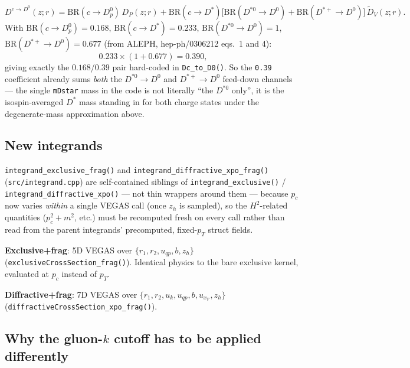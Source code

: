 \documentclass[11pt]{article}
\begin{document}
\[
D^{c\to D^0}(z;r) = \mathrm{BR}(c\to D^0_p)\,D_P(z;r)
   + \mathrm{BR}(c\to D^*)\big[\mathrm{BR}(D^{*0}\to D^0)
   + \mathrm{BR}(D^{*+}\to D^0)\big]\,\tilde D_V(z;r).
\]
With $\mathrm{BR}(c\to D^0_p)=0.168$, $\mathrm{BR}(c\to D^*)=0.233$,
$\mathrm{BR}(D^{*0}\to D^0)=1$, $\mathrm{BR}(D^{*+}\to D^0)=0.677$ (from
ALEPH, hep-ph/0306212 eqs.\ 1 and 4):
\[
0.233\times(1+0.677) = 0.390,
\]
giving exactly the $0.168$/$0.39$ pair hard-coded in
\texttt{Dc\_to\_D0()}. So the \texttt{0.39} coefficient already sums
\emph{both} the $D^{*0}\to D^0$ and $D^{*+}\to D^0$ feed-down channels —
the single \texttt{mDstar} mass in the code is not literally
``the $D^{*0}$ only'', it is the isospin-averaged $D^*$ mass standing in
for both charge states under the degenerate-mass approximation above.

\subsection{New integrands}

\texttt{integrand\_exclusive\_frag()} and
\texttt{integrand\_diffractive\_xpo\_frag()} (\texttt{src/integrand.cpp})
are self-contained siblings of \texttt{integrand\_exclusive()} /
\texttt{integrand\_diffractive\_xpo()} — not thin wrappers around them —
because $p_c$ now varies \emph{within} a single VEGAS call (once $z_h$ is
sampled), so the $H^2$-related quantities ($p_c^2+m^2$, etc.) must be
recomputed fresh on every call rather than read from the parent
integrands' precomputed, fixed-$p_T$ struct fields.

\textbf{Exclusive+frag}: 5D VEGAS over $\{r_1,r_2,u_{qp},b,z_h\}$
(\texttt{exclusiveCrossSection\_frag()}). Identical physics to the bare
exclusive kernel, evaluated at $p_c$ instead of $p_T$.

\textbf{Diffractive+frag}: 7D VEGAS over
$\{r_1,r_2,u_k,u_{qp},b,u_{x_{\mathbb P}},z_h\}$
(\texttt{diffractiveCrossSection\_xpo\_frag()}).

\subsection{Why the gluon-$k$ cutoff has to be applied differently}
\end{document}
